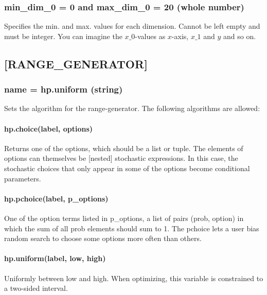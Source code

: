 \documentclass[]{scrartcl}
\begin{document}
\subsubsection{min\_dim\_0 = 0 and max\_dim\_0 = 20 (whole number)}

Specifies the min. and max. values for each dimension. Cannot be left
empty and must be integer. You can imagine the $x\_0$-values as $x$-axis,
$x\_1$ and $y$ and so on.

\subsection{[RANGE\_GENERATOR]}

\subsubsection{name = hp.uniform (string)}

Sets the algorithm for the range-generator. The following algorithms are
allowed:

        \paragraph{hp.choice(label, options)}
                        Returns one of the options, which should be a list or tuple.
                        The elements of options can themselves be [nested]
                        stochastic expressions. In this case, the stochastic choices
                        that only appear in some of the options become conditional
                        parameters.

        \paragraph{hp.pchoice(label, p\_options)}
                        One of the option terms listed in p\_options, a list of pairs
                        (prob, option) in which the sum of all prob elements should
                        sum to 1. The pchoice lets a user bias random search to
                        choose some options more often than others.

        \paragraph{hp.uniform(label, low, high)}
                        Uniformly between low and high. When optimizing, this
                        variable is constrained to a two-sided interval.
\end{document}
